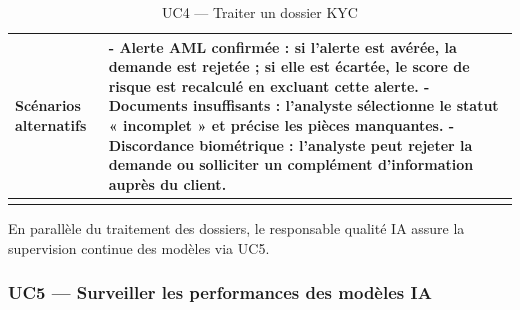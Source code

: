\begin{longtable}{|>{\bfseries}p{3.8cm}|p{10.2cm}|}
  \hline
  Scénarios alternatifs &
    - Alerte AML confirmée : si l'alerte est avérée, la demande est rejetée ; si elle est écartée, le score de risque est recalculé en excluant cette alerte. \newline
    - Documents insuffisants : l'analyste sélectionne le statut « incomplet » et précise les pièces manquantes. \newline
    - Discordance biométrique : l'analyste peut rejeter la demande ou solliciter un complément d'information auprès du client. \\
  \hline
  \caption{UC4 --- Traiter un dossier KYC}
  \label{tab:uc4}
\end{longtable}

En parallèle du traitement des dossiers, le responsable qualité IA assure la supervision continue des modèles via UC5.

\subsubsection{UC5 --- Surveiller les performances des modèles IA}

